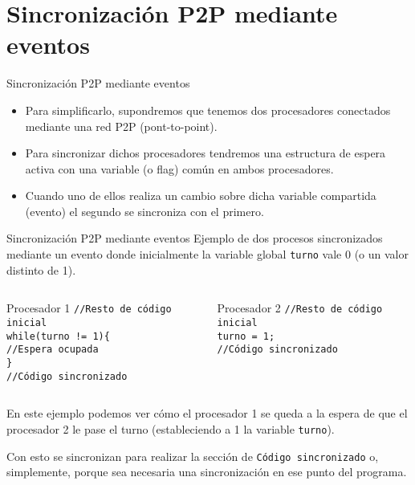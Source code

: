 \documentclass{beamer}
\begin{document}
\section{Sincronización P2P mediante eventos}
\begin{frame}{Sincronización P2P mediante eventos}
	\begin{itemize}
		\item Para simplificarlo, supondremos que tenemos dos procesadores conectados mediante una red P2P (pont-to-point).
		
		\item Para sincronizar dichos procesadores tendremos una estructura de espera activa con una variable (o flag) común en ambos procesadores.
		
		\item Cuando uno de ellos realiza un cambio sobre dicha variable compartida (evento) el segundo se sincroniza con el primero.
	\end{itemize}
\end{frame}

\begin{frame}{Sincronización P2P mediante eventos}
Ejemplo de dos procesos sincronizados mediante un evento donde inicialmente la variable global \texttt{turno} vale 0 (o un valor distinto de 1).
	\begin{columns}
		\begin{block}{Procesador 1}
			\texttt{//Resto de código inicial\\
			while(turno != 1)\{\\
			\hspace{0.8cm}//Espera ocupada\\
			\}\\
			//Código sincronizado}
		\end{block}
		\begin{block}{Procesador 2}
			\texttt{//Resto de código inicial\\
			turno = 1;\\
			//Código sincronizado}
		\end{block}
	\end{columns}
\vspace{0.5cm}
En este ejemplo podemos ver cómo el procesador 1 se queda a la espera de que el procesador 2 le pase el turno (estableciendo a 1 la variable \texttt{turno}).

Con esto se sincronizan para realizar la sección de \texttt{Código sincronizado} o, simplemente, porque sea necesaria una sincronización en ese punto del programa.
\end{frame}
\end{document}
